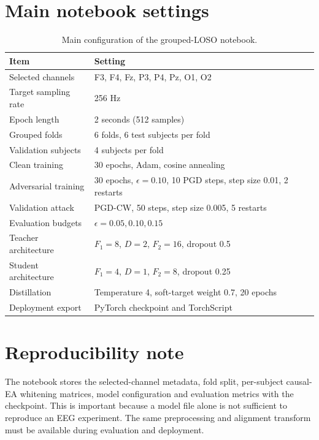 \documentclass[10pt,a4paper,openright]{report}
\begin{document}
\section{Main notebook settings}
\begin{table}[H]
\centering
\small
\caption{Main configuration of the grouped-LOSO notebook.}
\begin{tabularx}{\textwidth}{p{}X}
\toprule
Item & Setting \\
\midrule
Selected channels & F3, F4, Fz, P3, P4, Pz, O1, O2 \\
Target sampling rate & 256 Hz \\
Epoch length & 2 seconds (512 samples) \\
Grouped folds & 6 folds, 6 test subjects per fold \\
Validation subjects & 4 subjects per fold \\
Clean training & 30 epochs, Adam, cosine annealing \\
Adversarial training & 30 epochs, $\epsilon=0.10$, 10 PGD steps, step size 0.01, 2 restarts \\
Validation attack & PGD-CW, 50 steps, step size 0.005, 5 restarts \\
Evaluation budgets & $\epsilon=0.05,0.10,0.15$ \\
Teacher architecture & $F_1=8$, $D=2$, $F_2=16$, dropout 0.5 \\
Student architecture & $F_1=4$, $D=1$, $F_2=8$, dropout 0.25 \\
Distillation & Temperature 4, soft-target weight 0.7, 20 epochs \\
Deployment export & PyTorch checkpoint and TorchScript \\
\bottomrule
\end{tabularx}
\end{table}

\section{Reproducibility note}
The notebook stores the selected-channel metadata, fold split, per-subject causal-EA whitening matrices, model configuration and evaluation metrics with the checkpoint. This is important because a model file alone is not sufficient to reproduce an EEG experiment. The same preprocessing and alignment transform must be available during evaluation and deployment.
\end{document}
